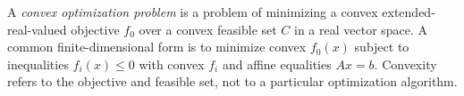 
A \emph{convex optimization problem} is a problem of minimizing a convex extended-real-valued objective $f_0$ over a convex feasible set $C$ in a real vector space. A common finite-dimensional form is to minimize convex $f_0(x)$ subject to inequalities $f_i(x)\le0$ with convex $f_i$ and affine equalities $Ax=b$. Convexity refers to the objective and feasible set, not to a particular optimization algorithm.
